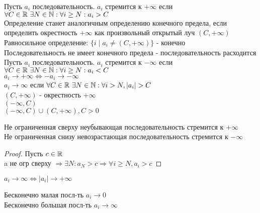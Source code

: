 
Пусть $a_i$ последовательность.
$ a_i $ стремится к $ +\infty$ если $ \forall C \in \mathbb{R} \  \exists N \in \mathbb{N} : \forall i \geq N : a_i > C $ \\
Определение станет аналогичным определению конечного предела, если определить окрестность $ +\infty $ как произвольный открытый луч $ (C, +\infty)$ \\
Равносильное определение: $ \{i \mid a_i \neq (C, +\infty) \} $ - конечно \\
Последовательность не имеет конечного предела - последовательность расходится \\
Пусть $a_i$ последовательность.
$ a_i $ стремится к $ -\infty$ если $ \forall C \in \mathbb{R} \  \exists N \in \mathbb{N} : \forall i \geq N : a_i < C $ \\
$ a_i \rightarrow +\infty \Leftrightarrow -a_i \rightarrow -\infty $\\
$ a_i \rightarrow \infty $ если $ \forall C \in \mathbb{R} \ \exists N \in \mathbb{N} : \forall i > N, |a_i| > C $ \\
$ ( C, +\infty )$ - окрестность $+\infty$ \\
$ (-\infty, C) $ \\
$ (-\infty, C) \cup ( C, +\infty), C > 0 $  \\

\begin{theorem}
	Не ограниченная сверху неубывающая последовательность стремится к $ + \infty $ \\
	Не ограниченная снизу невозрастающая последовательность стремится к $ -\infty $ \\
	\begin{proof}
		Пусть $ c \in \mathbb{R} $ \\
		a не огр сверху $ \Rightarrow \exists N : a_N > c \Rightarrow \forall i \geq N, a_i > c $
	\end{proof}
\end{theorem}

$ a_i \rightarrow \infty \Leftrightarrow |a_i | \rightarrow +\infty $ \\
\begin{definition}
	Бесконечно малая посл-ть $ a_i \rightarrow 0 $ \\
	Бесконечно большая посл-ть $ a_i \rightarrow \infty $ \\
\end{definition}

